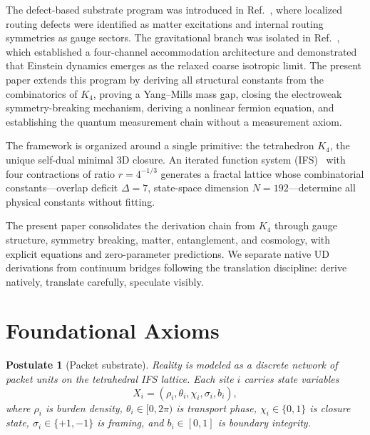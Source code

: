 \documentclass[11pt,twocolumn]{article}
\newtheorem{postulate}{Postulate}
\begin{document}
The defect-based substrate program was introduced in Ref.~\cite{mayes2026dd}, where localized routing defects were identified as matter excitations and internal routing symmetries as gauge sectors.
The gravitational branch was isolated in Ref.~\cite{mayes2026grav}, which established a four-channel accommodation architecture and demonstrated that Einstein dynamics emerges as the relaxed coarse isotropic limit.
The present paper extends this program by deriving all structural constants from the combinatorics of $K_4$, proving a Yang--Mills mass gap, closing the electroweak symmetry-breaking mechanism, deriving a nonlinear fermion equation, and establishing the quantum measurement chain without a measurement axiom.

The framework is organized around a single primitive: the tetrahedron $K_4$, the unique self-dual minimal 3D closure.
An iterated function system (IFS)~\cite{hutchinson1981,falconer2003} with four contractions of ratio $r=4^{-1/3}$ generates a fractal lattice whose combinatorial constants---overlap deficit $\Delta=7$, state-space dimension $N=192$---determine all physical constants without fitting.

The present paper consolidates the derivation chain from $K_4$ through gauge structure, symmetry breaking, matter, entanglement, and cosmology, with explicit equations and zero-parameter predictions.
We separate native UD derivations from continuum bridges following the translation discipline: derive natively, translate carefully, speculate visibly.

\section{Foundational Axioms}
\label{sec:axioms}

\begin{postulate}[Packet substrate]
Reality is modeled as a discrete network of packet units on the tetrahedral IFS lattice.
Each site $i$ carries state variables
\begin{equation}
X_i = (\rho_i, \theta_i, \chi_i, \sigma_i, b_i),
\label{eq:packet}
\end{equation}
where $\rho_i$ is burden density, $\theta_i\in[0,2\pi)$ is transport phase, $\chi_i\in\{0,1\}$ is closure state, $\sigma_i\in\{+1,-1\}$ is framing, and $b_i\in[0,1]$ is boundary integrity.
\end{postulate}
\end{document}
